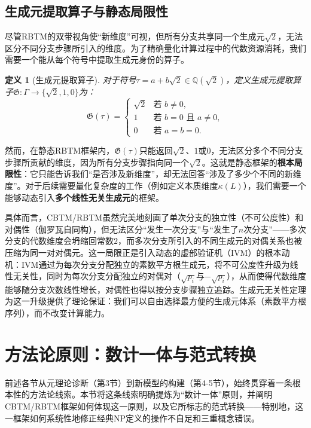 \documentclass{ctexart}
\newtheorem{definition}[theorem]{定义}
\begin{document}
	\subsection{生成元提取算子与静态局限性}
	
	尽管RBTM的双带视角使``新维度''可视，但所有分支共享同一个生成元$\sqrt{2}$，无法区分不同分支步骤所引入的维度。为了精确量化计算过程中的代数资源消耗，我们需要一个能从每个符号中提取生成元身份的算子。
	
	\begin{definition}[生成元提取算子]\label{def:generator-extraction}
		对于符号$\tau = a+b\sqrt{2}\in\mathbb{Q}(\sqrt{2})$，定义生成元提取算子$\mathfrak{G}:\Gamma\to\{\sqrt{2},1,0\}$为：
		\[
		\mathfrak{G}(\tau) = \begin{cases}
			\sqrt{2} & \text{若 } b\neq 0,\\
			1 & \text{若 } b=0\text{ 且 } a\neq 0,\\
			0 & \text{若 } a=b=0.
		\end{cases}
		\]
	\end{definition}
	
	然而，在静态RBTM框架内，$\mathfrak{G}(\tau)$只能返回$\sqrt{2}$、$1$或$0$，无法区分多个不同分支步骤所贡献的维度，因为所有分支步骤指向同一个$\sqrt{2}$。这就是静态框架的\textbf{根本局限性}：它只能告诉我们``是否涉及新维度''，却无法回答``涉及了多少个不同的新维度''。对于后续需要量化复杂度的工作（例如定义本质维度$\kappa(L)$），我们需要一个能够动态引入\textbf{多个线性无关生成元}的框架。
	
	具体而言，CBTM/RBTM虽然完美地刻画了单次分支的独立性（不可公度性）和对偶性（伽罗瓦自同构），但无法区分``发生一次分支''与``发生了$n$次分支''——多次分支的代数维度会坍缩回常数$2$，而多次分支所引入的不同生成元的对偶关系也被压缩为同一对对偶元。这一局限正是引入动态的虚部验证机（IVM）的根本动机：IVM通过为每次分支分配独立的素数平方根生成元，将不可公度性升级为线性无关性，同时为每次分支分配独立的对偶对（$\sqrt{p_i}$与$-\sqrt{p_i}$），从而使得代数维度能够随分支次数线性增长，对偶性也得以按分支步骤独立追踪。生成元无关性定理为这一升级提供了理论保证：我们可以自由选择最方便的生成元体系（素数平方根序列），而不改变计算能力。
	
	\section{方法论原则：数计一体与范式转换}
	
	前述各节从元理论诊断（第3节）到新模型的构建（第4-5节），始终贯穿着一条根本性的方法论线索。本节将这条线索明确提炼为``数计一体''原则，并阐明CBTM/RBTM框架如何体现这一原则，以及它所标志的范式转换——特别地，这一框架如何系统性地修正经典NP定义的操作不自足和三重概念错误。
	
\end{document}
